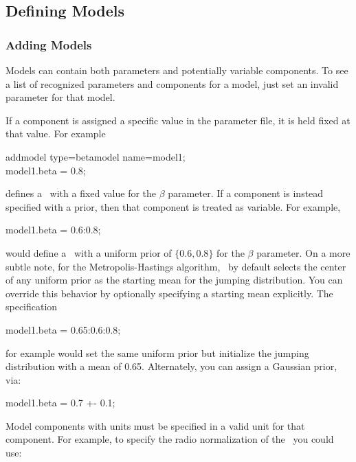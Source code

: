 \subsection{Defining Models}
\subsubsection{Adding Models}
Models can contain both parameters and potentially variable
components.  To see a list of recognized parameters and components for
a model, just set an invalid parameter for that model.

If a component is assigned a specific value in the
parameter file, it is held fixed at that value.  For example

\begin{myindentpar}{3cm}
addmodel type=betamodel name=model1;\\
model1.beta = 0.8;
\end{myindentpar}

defines a \betamodel\ with a fixed value for the $\beta$ parameter.
If a component is instead specified with a prior, then that component
is treated as variable.  For example,

\begin{myindentpar}{3cm}
model1.beta = 0.6:0.8;
\end{myindentpar}

would define a \betamodel\ with a uniform prior of $\{0.6, 0.8\}$ for
the $\beta$ parameter.  On a more subtle note, for the Metropolis-Hastings algorithm,
\climax\ by default selects the center of any uniform prior as the
starting mean for the jumping distribution.  You can override this
behavior by optionally specifying a starting mean explicitly.  The
specification

\begin{myindentpar}{3cm}
model1.beta = 0.65:0.6:0.8;
\end{myindentpar}

for example would set the same uniform prior but initialize the
jumping distribution with a mean of 0.65.  Alternately, you can assign
a Gaussian prior, via:

\begin{myindentpar}{3cm}
model1.beta = 0.7 +- 0.1;
\end{myindentpar}

Model components with units must be specified in a valid unit for that
component.  For example, to specify the radio normalization of the
\betamodel\ you could use:


